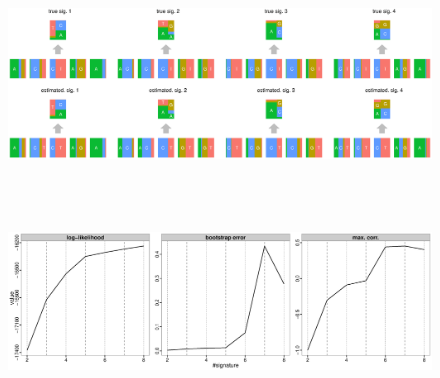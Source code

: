 \documentclass{article}
\begin{document}
% 
%
%
%
%





\clearpage

\begin{figure}
\centering
\includegraphics[width=15cm,height=5.5cm]{simulation_signature_example.eps}
\caption{}
\label{example_signature.pd}
\end{figure}


\clearpage

\begin{figure}
\centering
\includegraphics[width=15cm,height=5cm]{simulation_stat.eps}
\caption{}
\label{example_summary.pd}
\end{figure}

\clearpage
\end{document}
